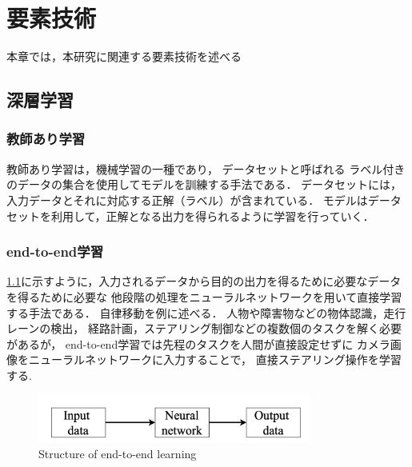 \chapter{要素技術}
\label{chap:elemental}
本章では，本研究に関連する要素技術を述べる
\section{深層学習}
\subsection{教師あり学習}
教師あり学習は，機械学習の一種であり，
データセットと呼ばれる
ラベル付きのデータの集合を使用してモデルを訓練する手法である．
データセットには，入力データとそれに対応する正解（ラベル）が含まれている．
モデルはデータセットを利用して，正解となる出力を得られるように学習を行っていく．

\subsection{end-to-end学習}
\ref{fig:e2e}に示すように，入力されるデータから目的の出力を得るために必要なデータを得るために必要な
他段階の処理をニューラルネットワークを用いて直接学習する手法である．
自律移動を例に述べる．
人物や障害物などの物体認識，走行レーンの検出，
経路計画，ステアリング制御などの複数個のタスクを解く必要があるが， 
end-to-end学習では先程のタスクを人間が直接設定せずに
カメラ画像をニューラルネットワークに入力することで，
直接ステアリング操作を学習する.
\begin{figure}[htbp]
    \centering
     \includegraphics[width=90mm]{images/pdf/e2e.pdf}
     \caption{Structure of end-to-end learning}
     \label{fig:e2e}
\end{figure}

\newpage
